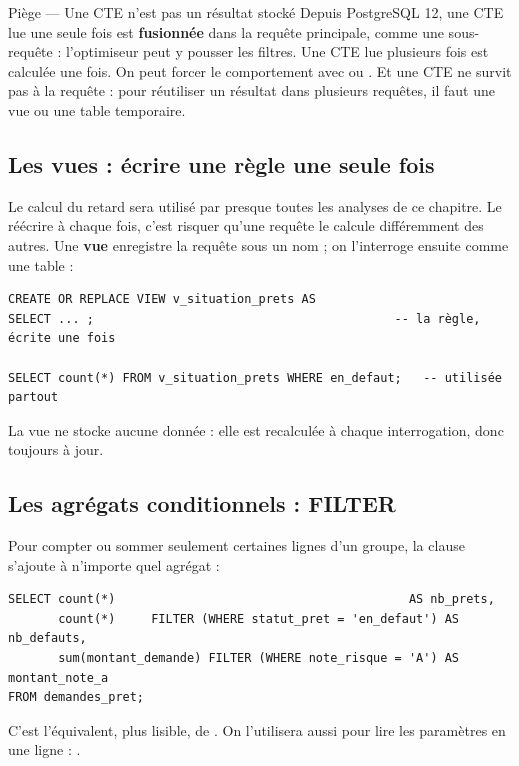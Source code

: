 \begin{piege}{Piège --- Une CTE n'est pas un résultat stocké}
Depuis PostgreSQL 12, une CTE lue une seule fois est \textbf{fusionnée} dans la requête principale,
comme une sous-requête : l'optimiseur peut y pousser les filtres. Une CTE lue plusieurs fois est
calculée une fois. On peut forcer le comportement avec  ou
. Et une CTE ne survit pas à la requête : pour réutiliser un résultat dans
plusieurs requêtes, il faut une vue ou une table temporaire.
\end{piege}

\subsection{Les vues : écrire une règle une seule fois}

Le calcul du retard sera utilisé par presque toutes les analyses de ce chapitre. Le réécrire à chaque
fois, c'est risquer qu'une requête le calcule différemment des autres. Une \textbf{vue} enregistre la
requête sous un nom ; on l'interroge ensuite comme une table :
\begin{lstlisting}[style=sql]
CREATE OR REPLACE VIEW v_situation_prets AS
SELECT ... ;                                          -- la règle, écrite une fois

SELECT count(*) FROM v_situation_prets WHERE en_defaut;   -- utilisée partout
\end{lstlisting}
La vue ne stocke aucune donnée : elle est recalculée à chaque interrogation, donc toujours à jour.

\subsection{Les agrégats conditionnels : FILTER}

Pour compter ou sommer seulement certaines lignes d'un groupe, la clause  s'ajoute à
n'importe quel agrégat :
\begin{lstlisting}[style=sql]
SELECT count(*)                                         AS nb_prets,
       count(*)     FILTER (WHERE statut_pret = 'en_defaut') AS nb_defauts,
       sum(montant_demande) FILTER (WHERE note_risque = 'A') AS montant_note_a
FROM demandes_pret;
\end{lstlisting}
C'est l'équivalent, plus lisible, de . On l'utilisera aussi
pour lire les paramètres en une ligne : .

